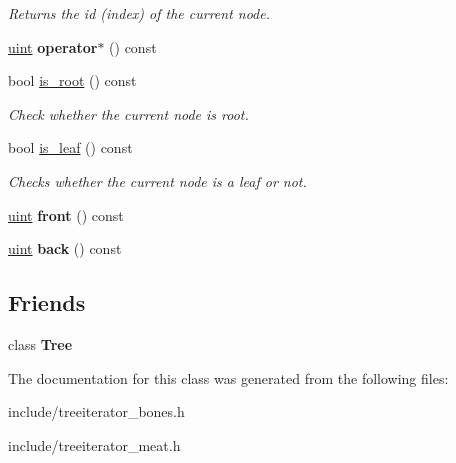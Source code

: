 \begin{DoxyCompactItemize}
\begin{DoxyCompactList}\small\item\em Returns the id (index) of the current node. \end{DoxyCompactList}\item 
\hyperlink{typedefs_8h_a91ad9478d81a7aaf2593e8d9c3d06a14}{uint} {\bfseries operator$\ast$} () const \hypertarget{classTreeIterator_a94819be0c93c76f72cf34b584d7add79}{}\label{classTreeIterator_a94819be0c93c76f72cf34b584d7add79}

\item 
bool \hyperlink{classTreeIterator_a641055ff6b66b09cc6b4826e3b826b28}{is\+\_\+root} () const \hypertarget{classTreeIterator_a641055ff6b66b09cc6b4826e3b826b28}{}\label{classTreeIterator_a641055ff6b66b09cc6b4826e3b826b28}

\begin{DoxyCompactList}\small\item\em Check whether the current node is root. \end{DoxyCompactList}\item 
bool \hyperlink{classTreeIterator_a42538b1bf741b30d6bda489f1944d033}{is\+\_\+leaf} () const \hypertarget{classTreeIterator_a42538b1bf741b30d6bda489f1944d033}{}\label{classTreeIterator_a42538b1bf741b30d6bda489f1944d033}

\begin{DoxyCompactList}\small\item\em Checks whether the current node is a leaf or not. \end{DoxyCompactList}\item 
\hyperlink{typedefs_8h_a91ad9478d81a7aaf2593e8d9c3d06a14}{uint} {\bfseries front} () const \hypertarget{classTreeIterator_ae2db13b649fed318efb85eb84209c9d1}{}\label{classTreeIterator_ae2db13b649fed318efb85eb84209c9d1}

\item 
\hyperlink{typedefs_8h_a91ad9478d81a7aaf2593e8d9c3d06a14}{uint} {\bfseries back} () const \hypertarget{classTreeIterator_a6916561fe4515aa88b4af8344b16c1fd}{}\label{classTreeIterator_a6916561fe4515aa88b4af8344b16c1fd}

\end{DoxyCompactItemize}
\subsection*{Friends}
\begin{DoxyCompactItemize}
\item 
class {\bfseries Tree}\hypertarget{classTreeIterator_a4b682814d14447120dd184fd300deade}{}\label{classTreeIterator_a4b682814d14447120dd184fd300deade}

\end{DoxyCompactItemize}


The documentation for this class was generated from the following files\+:\begin{DoxyCompactItemize}
\item 
include/treeiterator\+\_\+bones.\+h\item 
include/treeiterator\+\_\+meat.\+h\end{DoxyCompactItemize}
